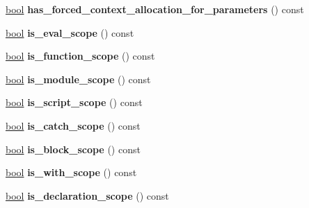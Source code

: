 \begin{DoxyCompactItemize}
\mbox{\hyperlink{classbool}{bool}} {\bfseries has\+\_\+forced\+\_\+context\+\_\+allocation\+\_\+for\+\_\+parameters} () const
\item 
\mbox{\label{classv8_1_1internal_1_1Scope_a6e16b2908581580a659f072b7ed54daf}} 
\mbox{\hyperlink{classbool}{bool}} {\bfseries is\+\_\+eval\+\_\+scope} () const
\item 
\mbox{\label{classv8_1_1internal_1_1Scope_a7040bb2301f9c3e6515feca619c2065e}} 
\mbox{\hyperlink{classbool}{bool}} {\bfseries is\+\_\+function\+\_\+scope} () const
\item 
\mbox{\label{classv8_1_1internal_1_1Scope_af333963782378318ea8b04d99162e2af}} 
\mbox{\hyperlink{classbool}{bool}} {\bfseries is\+\_\+module\+\_\+scope} () const
\item 
\mbox{\label{classv8_1_1internal_1_1Scope_a46f4718f676da7af328b347dc1ca1200}} 
\mbox{\hyperlink{classbool}{bool}} {\bfseries is\+\_\+script\+\_\+scope} () const
\item 
\mbox{\label{classv8_1_1internal_1_1Scope_aeb194c5645d344fbbb98c70058eae89c}} 
\mbox{\hyperlink{classbool}{bool}} {\bfseries is\+\_\+catch\+\_\+scope} () const
\item 
\mbox{\label{classv8_1_1internal_1_1Scope_ac05e88ec72cf48f212e9b1eb82033a8d}} 
\mbox{\hyperlink{classbool}{bool}} {\bfseries is\+\_\+block\+\_\+scope} () const
\item 
\mbox{\label{classv8_1_1internal_1_1Scope_ab7550c4649846344771cd0b4951972b8}} 
\mbox{\hyperlink{classbool}{bool}} {\bfseries is\+\_\+with\+\_\+scope} () const
\item 
\mbox{\label{classv8_1_1internal_1_1Scope_afbdff34a4b4f7d42fb44c95145812c7b}} 
\mbox{\hyperlink{classbool}{bool}} {\bfseries is\+\_\+declaration\+\_\+scope} () const
\item 
\mbox{\label{classv8_1_1internal_1_1Scope_a71ca052c576724f81fdd33d1e893c914}} 

\end{DoxyCompactItemize}
